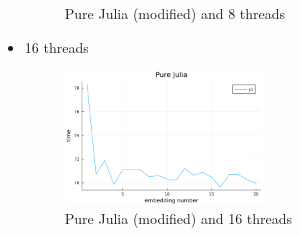 \begin{itemize}
\begin{figure}[H]
        \caption{Pure Julia (modified) and 8 threads}
    \end{figure}
    \item 16 threads
    \begin{figure}[H]
        \includegraphics[width=0.5\textwidth]{media/bhembed16.png}
        \caption{Pure Julia (modified) and 16 threads}
    \end{figure}
\end{itemize}